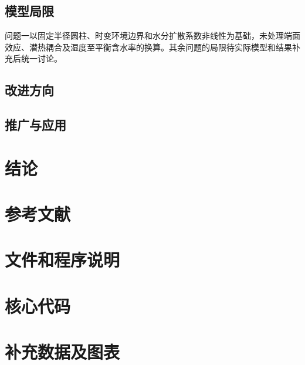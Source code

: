 \documentclass[withoutpreface,bwprint]{cumcmthesis}
\begin{document}
\subsection{模型局限}

问题一以固定半径圆柱、时变环境边界和水分扩散系数非线性为基础，未处理端面效应、潜热耦合及湿度至平衡含水率的换算。其余问题的局限待实际模型和结果补充后统一讨论。

\subsection{改进方向}
\vspace{0.06\textheight}

\subsection{推广与应用}
\vspace{0.06\textheight}

\section{结论}
\vspace{0.10\textheight}

\section*{参考文献}
\vspace{0.08\textheight}

\clearpage
\begin{appendices}
\section{文件和程序说明}
\vspace{0.10\textheight}

\section{核心代码}
\vspace{0.10\textheight}

\section{补充数据及图表}
\vspace{0.10\textheight}
\end{appendices}

\end{document}
